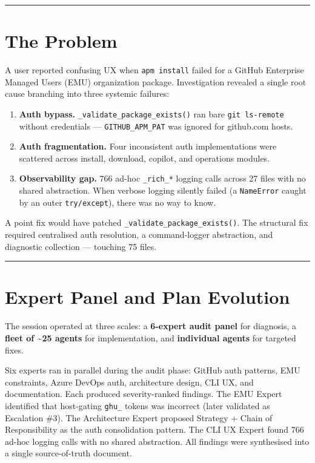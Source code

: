 \documentclass[
  a4paper,
  DIV=11,
  numbers=noendperiod]{scrreprt}
\providecommand{\tightlist}{%
  \setlength{\itemsep}{0pt}\setlength{\parskip}{0pt}}
\begin{document}
\begin{center}\rule{0.5\linewidth}{0.5pt}\end{center}

\section{The Problem}\label{the-problem}

A user reported confusing UX when \texttt{apm\ install} failed for a
GitHub Enterprise Managed Users (EMU) organization package.
Investigation revealed a single root cause branching into three systemic
failures:

\begin{enumerate}
\def\labelenumi{\arabic{enumi}.}
\tightlist
\item
  \textbf{Auth bypass.} \texttt{\_validate\_package\_exists()} ran bare
  \texttt{git\ ls-remote} without credentials ---
  \texttt{GITHUB\_APM\_PAT} was ignored for github.com hosts.
\item
  \textbf{Auth fragmentation.} Four inconsistent auth implementations
  were scattered across install, download, copilot, and operations
  modules.
\item
  \textbf{Observability gap.} 766 ad-hoc \texttt{\_rich\_*} logging
  calls across 27 files with no shared abstraction. When verbose logging
  silently failed (a \texttt{NameError} caught by an outer
  \texttt{try/except}), there was no way to know.
\end{enumerate}

A point fix would have patched \texttt{\_validate\_package\_exists()}.
The structural fix required centralised auth resolution, a
command-logger abstraction, and diagnostic collection --- touching 75
files.

\begin{center}\rule{0.5\linewidth}{0.5pt}\end{center}

\section{Expert Panel and Plan
Evolution}\label{expert-panel-and-plan-evolution}

The session operated at three scales: a \textbf{6-expert audit panel}
for diagnosis, a \textbf{fleet of \textasciitilde25 agents} for
implementation, and \textbf{individual agents} for targeted fixes.

Six experts ran in parallel during the audit phase: GitHub auth
patterns, EMU constraints, Azure DevOps auth, architecture design, CLI
UX, and documentation. Each produced severity-ranked findings. The EMU
Expert identified that host-gating \texttt{ghu\_} tokens was incorrect
(later validated as Escalation \#3). The Architecture Expert proposed
Strategy + Chain of Responsibility as the auth consolidation pattern.
The CLI UX Expert found 766 ad-hoc logging calls with no shared
abstraction. All findings were synthesised into a single source-of-truth
document.
\end{document}
